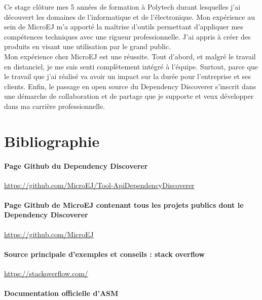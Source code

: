 \documentclass[french,a4paper,12pt]{report}
\begin{document}
Ce stage clôture mes 5 années de formation à Polytech durant lesquelles j'ai découvert les domaines de l'informatique et de l'électronique. 
Mon expérience au sein de MicroEJ m’a apporté la maîtrise d'outils permettant d'appliquer mes compétences techniques avec une rigueur professionnelle. J'ai appris à créer des produits en visant une utilisation par le grand public.\\ 

Mon expérience chez MicroEJ est une réussite. Tout d'abord, et malgré le travail en distanciel, je me suis senti complètement intégré à l'équipe. Surtout, parce que le travail que j'ai réalisé va avoir un impact sur la durée pour l'entreprise et ses clients. Enfin, le passage en open source du Dependency Discoverer s'inscrit dans une démarche de collaboration et de partage que je supporte et veux développer dans ma carrière professionnelle.


\chapter*{Bibliographie}

\subsubsection{Page Github du Dependency Discoverer}

\href{https://github.com/MicroEJ/Tool-ApiDependencyDiscoverer}{https://github.com/MicroEJ/Tool-ApiDependencyDiscoverer}

\subsubsection{Page Github de MicroEJ contenant tous les projets publics dont le Dependency Discoverer}

\href{https://github.com/MicroEJ}{https://github.com/MicroEJ}

\subsubsection{Source principale d'exemples et conseils : stack overflow}

\href{https://stackoverflow.com/}{https://stackoverflow.com/}

\subsubsection{Documentation officielle d'ASM}
\end{document}
